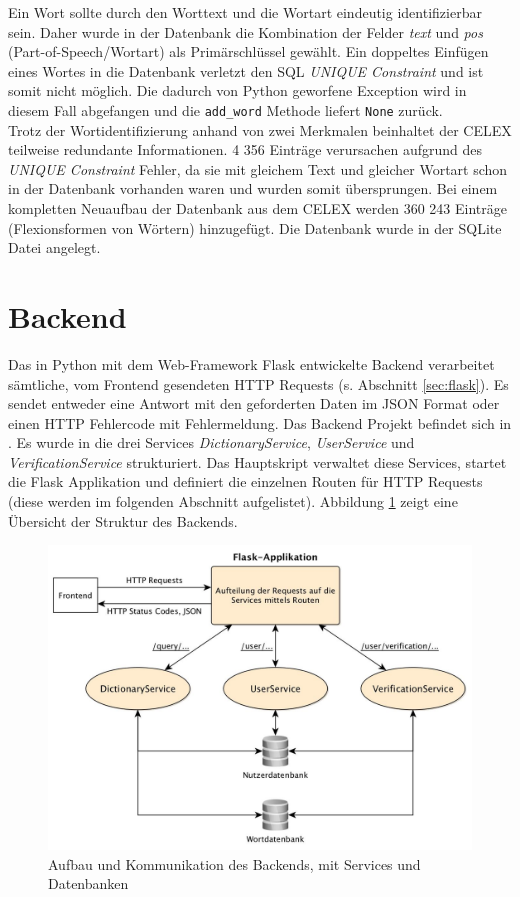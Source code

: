 Ein Wort sollte durch den Worttext und die Wortart eindeutig identifizierbar sein. Daher wurde in der Datenbank die Kombination der Felder \textit{text} und \textit{pos} (Part-of-Speech/Wortart) als Primärschlüssel gewählt. Ein doppeltes Einfügen eines Wortes in die Datenbank verletzt den SQL \textit{UNIQUE Constraint} und ist somit nicht möglich. Die dadurch von Python geworfene Exception wird in diesem Fall abgefangen und die \texttt{add\_word} Methode liefert \texttt{None} zurück.\\
Trotz der Wortidentifizierung anhand von zwei Merkmalen beinhaltet der CELEX teilweise redundante Informationen. 4 356 Einträge verursachen aufgrund des \textit{UNIQUE Constraint} Fehler, da sie mit gleichem Text und gleicher Wortart schon in der Datenbank vorhanden waren und wurden somit übersprungen. Bei einem kompletten Neuaufbau der Datenbank aus dem CELEX werden 360 243 Einträge (Flexionsformen von Wörtern) hinzugefügt. Die Datenbank wurde in der SQLite Datei  angelegt.

\section{Backend}
\label{sec:etwicklung-backend}
Das in Python mit dem Web-Framework Flask entwickelte Backend verarbeitet sämtliche, vom Frontend gesendeten HTTP Requests (s. Abschnitt \ref{sec:flask}). Es sendet entweder eine Antwort mit den geforderten Daten im JSON Format oder einen HTTP Fehlercode mit Fehlermeldung. Das Backend Projekt befindet sich in . Es wurde in die drei Services \textit{DictionaryService}, \textit{UserService} und \textit{VerificationService} strukturiert. Das Hauptskript  verwaltet diese Services, startet die Flask Applikation und definiert die einzelnen Routen für HTTP Requests (diese werden im folgenden Abschnitt aufgelistet). Abbildung \ref{fig:backend} zeigt eine Übersicht der Struktur des Backends.

\begin{figure}[h!]
	\centering
	\includegraphics[width=.8\linewidth]{figures/backend}
	\caption{Aufbau und Kommunikation des Backends, mit Services und Datenbanken}
	\label{fig:backend}
\end{figure}

